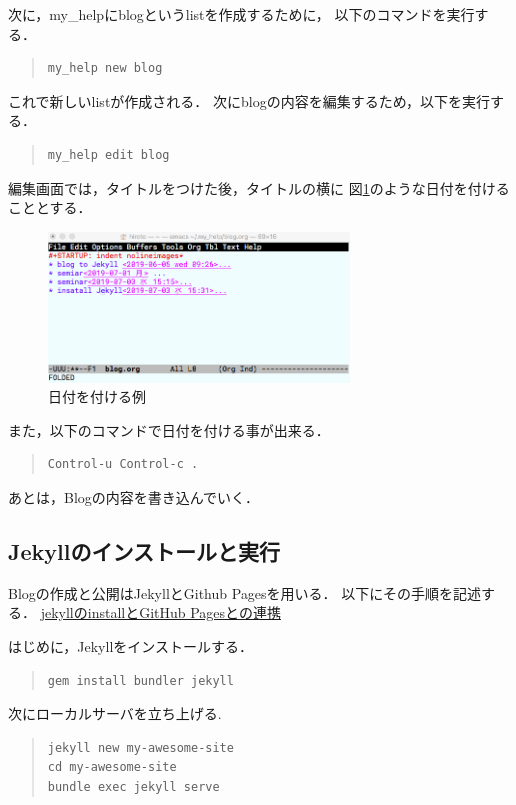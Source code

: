 \documentclass{jsarticle}
\begin{document}
次に，my\_helpにblogというlistを作成するために，
以下のコマンドを実行する．

\begin{quote}
\begin{verbatim}
my_help new blog
\end{verbatim}
\end{quote}

これで新しいlistが作成される．
次にblogの内容を編集するため，以下を実行する．
\begin{quote}
\begin{verbatim}
my_help edit blog
\end{verbatim}
\end{quote}

編集画面では，タイトルをつけた後，タイトルの横に
図\ref{fig:org564216f}のような日付を付けることとする．
\begin{figure}[htbp]
\centering
\includegraphics[width=8cm]{./images/add_date.png}
\caption{\label{fig:org564216f}
日付を付ける例}
\end{figure}

また，以下のコマンドで日付を付ける事が出来る．
\begin{quote}
\begin{verbatim}
Control-u Control-c .
\end{verbatim}
\end{quote}

あとは，Blogの内容を書き込んでいく．

\subsection{Jekyllのインストールと実行}
\label{sec:orgd3bb780}
Blogの作成と公開はJekyllとGithub Pagesを用いる．
以下にその手順を記述する．
\href{https://qiita.com/daddygongon/items/9b7182db29861744fc79}{jekyllのinstallとGitHub Pagesとの連携}

はじめに，Jekyllをインストールする．
\begin{quote}
\begin{verbatim}
gem install bundler jekyll
\end{verbatim}
\end{quote}

次にローカルサーバを立ち上げる.
\begin{quote}
\begin{verbatim}
jekyll new my-awesome-site
cd my-awesome-site
bundle exec jekyll serve
\end{verbatim}
\end{quote}
\end{document}

